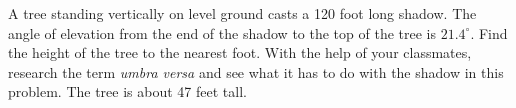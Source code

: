{A tree standing vertically on level ground casts a 120 foot long shadow.  The angle of elevation from the end of the shadow to the top of the tree is $21.4^{\circ}$.  Find the height of the tree to the nearest foot.  With the help of your classmates, research the term \emph{umbra versa} and see what it has to do with the shadow in this problem.}
{The tree is about 47 feet tall.}